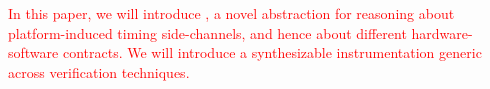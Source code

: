 \textcolor{red}{
In this paper, we will introduce \pics, a novel abstraction for reasoning about platform-induced timing side-channels, and hence about different hardware-software contracts.
We will introduce a synthesizable instrumentation generic across verification techniques.
}






